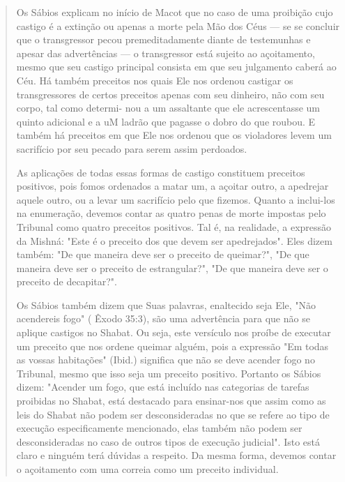 \begin{quote}
Os Sábios explicam no início de Macot que no caso de uma proibi­ção cujo
castigo é a extinção ou apenas a morte pela Mão dos Céus --- se se
concluir que o transgressor pecou premeditadamente diante de testemunhas
e apesar das advertências --- o transgressor está sujeito ao
açoitamento, mesmo que seu castigo principal consista em que seu
julgamento caberá ao Céu. Há também preceitos nos quais Ele nos ordenou
castigar os transgressores de cer­tos preceitos apenas com seu dinheiro,
não com seu corpo, tal como determi-
nou a um assaltante que ele acrescentasse um quinto adicional e a uM
ladrão que pagasse o dobro do que roubou. E também há preceitos em que
Ele nos ordenou que os violadores levem um sacrifício por seu pecado
para serem as­sim perdoados.

As aplicações de todas essas formas de castigo constituem preceitos
positivos, pois fomos ordenados a matar um, a açoitar outro, a apedrejar
aque­le outro, ou a levar um sacrifício pelo que fizemos. Quanto a
inclui-los na enu­meração, devemos contar as quatro penas de morte
impostas pelo Tribunal co­mo quatro preceitos positivos. Tal é, na
realidade, a expressão da Mishná: "Es­te é o preceito dos que devem ser
apedrejados". Eles dizem também: "De que maneira deve ser o preceito de
queimar?", "De que maneira deve ser o precei­to de estrangular?", "De
que maneira deve ser o preceito de decapitar?".

Os Sábios também dizem que Suas palavras, enaltecido seja Ele, "Não
acendereis fogo" ( Êxodo 35:3), são uma advertência para que não se
aplique castigos no Shabat. Ou seja, este versículo nos proíbe de
executar um preceito que nos ordene queimar alguém, pois a expressão "Em
todas as vossas habita­ções" (Ibid.) significa que não se deve acender
fogo no Tribunal, mesmo que isso seja um preceito positivo. Portanto os
Sábios dizem: "Acender um fogo, que está incluído nas categorias de
tarefas proibidas no Shabat, está destacado para ensinar-nos que assim
como as leis do Shabat não podem ser desconside­radas no que se refere
ao tipo de execução especificamente mencionado, elas também não podem
ser desconsideradas no caso de outros tipos de execução judicial". Isto
está claro e ninguém terá dúvidas a respeito. Da mesma forma, devemos
contar o açoitamento com uma correia como um preceito individual.


\end{quote}
